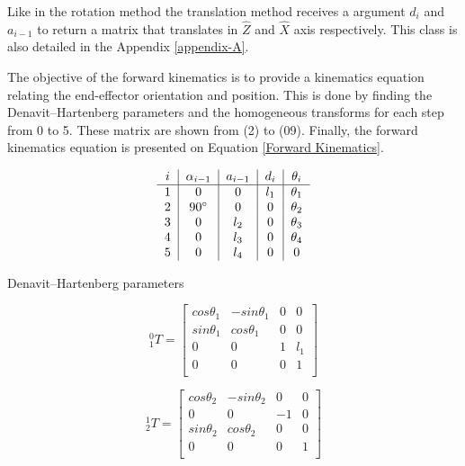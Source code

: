\documentclass[transmag]{IEEEtran}
\begin{document}
Like in the rotation method the translation method receives a argument $d_i$ and $a_{i-1}$ to return a matrix that translates in $\hat Z$ and $\hat X$ axis respectively. This class is also detailed in the Appendix \ref{appendix-A}.  

The objective of the forward kinematics is to provide a kinematics equation relating the end-effector orientation and position. This is done by finding the Denavit–Hartenberg parameters and the homogeneous transforms for each step from 0 to 5. These matrix are shown from (2) to (09). Finally, the forward kinematics equation is presented on Equation \ref{Forward Kinematics}.




\begin{eqfloat}
\begin{equation}
\begin{tabular}{c|c|c|c|c}
$i$  & $\alpha_{i-1}$ & $a_{i-1}$ & $d_i$        & $\theta_i$ \\
\hline
1    &  0             &  0         &  $l_1$ & $\theta_1$ \\
2    &  $90^{\circ}$        &  0         &  0     & $\theta_2$ \\
3    &  0             &  $l_2$     &  0     & $\theta_3$ \\
4    &  0             &  $l_3$     &  0     & $\theta_4$ \\
5    &  0             &  $l_4$     &  0     & 0 \\
\end{tabular}
\end{equation}

\begin{center}
Denavit–Hartenberg parameters
\end{center}




\begin{equation}
^0_1T =
\begin{bmatrix}
cos\theta_1 & -sin\theta_1 & 0 & 0   \\
sin\theta_1 & cos\theta_1  & 0 & 0   \\
0           & 0            & 1 & l_1 \\
0           & 0            & 0 & 1   \\
\end{bmatrix}
\end{equation}


\begin{equation}
^1_2T =
\begin{bmatrix}
cos\theta_2 & -sin\theta_2 & 0      & 0   \\
0           & 0            & -1     & 0   \\
sin\theta_2 & cos\theta_2  & 0      & 0   \\
0           & 0            & 0      & 1   \\
\end{bmatrix}
\end{equation}





\end{eqfloat}
\end{document}
